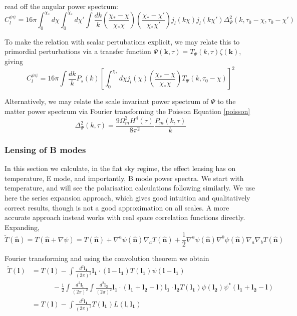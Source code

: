 \documentclass[a4paper,10pt]{article}
\renewcommand{\v}[1]{\mathbf{#1}}
\newcommand{\half}{\frac{1}{2}}
\newcommand{\finttwo}[1]{\int \frac{d^2 \v{#1}}{(2\pi)^2}}
\newcommand{\unit}[1]{\hat{\v{#1}}}
\begin{document}
read off the angular power spectrum:
\begin{equation}
C_l^{\psi\psi} = 16\pi \int_0^{\chi_*} d\chi \int_0^{\chi_*} d\chi' \int \frac{dk}{k} (\frac{\chi_*-\chi}{\chi_*\chi})(\frac{\chi_*-\chi'}{\chi_*\chi'})j_l(k\chi)j_l(k\chi')\Delta^2_\Psi(k, \tau_0-\chi, \tau_0-\chi')
\end{equation}

To make the relation with scalar pertubations explicit, we may relate this to primordial perturbations via a transfer function $\Psi(\v{k},\tau)=T_\Psi(k,\tau)\zeta(\v{k})$, giving
\begin{equation}
C_l^{\psi\psi} = 16\pi \int \frac{dk}{k} P_s(k) \left[\int_0^{\chi_*} d\chi j_l(\chi) (\frac{\chi_*-\chi}{\chi_*\chi})T_\Psi(k, \tau_0-\chi)\right]^2
\end{equation}

Alternatively, we may relate the scale invariant power spectrum of $\Psi$ to the matter power spectrum via Fourier transforming the Poisson Equation \ref{poisson}\\
\begin{equation}
\Delta^2_\Psi(k,\tau) = \frac{9\Omega^2_mH^4(\tau)}{8\pi^2}\frac{P_m(k,\tau)}{k}
\end{equation}

\subsubsection{Lensing of B modes} 

In this section we calculate, in the flat sky regime, the effect lensing has on temperature, E mode, and importantly, B mode power spectra. We start with temperature, and will see the polarisation calculations following similarly. We use here the series expansion approach, which gives good intuition and qualitatively correct results, though is not a good approximation on all scales. A more accurate approach instead works with real space correlation functions directly. Expanding,
\begin{equation}
\tilde{T}(\unit{n}) = T(\unit{n}+\nabla\psi) =T(\unit{n})+\nabla^a\psi(\unit{n})\nabla_aT(\unit{n})+\half\nabla^a\psi(\unit{n})\nabla^b\psi(\unit{n})\nabla_a\nabla_bT(\unit{n})
\end{equation}

Fourier transforming and using the convolution theorem we obtain
\begin{equation}\begin{split}
\tilde{T}(\v{l}) &= T(\v{l}) - \finttwo{l_1} \v{l_1}\cdot(\v{l}-\v{l_1})T(\v{l_1})\psi(\v{l}-\v{l_1}) \\
& \qquad \quad -\half \finttwo{l_1}\finttwo{l_2}\v{l_1}\cdot(\v{l_1}+\v{l_2}-\v{l})\v{l_1}\cdot\v{l_2}T(\v{l_1})\psi(\v{l_2})\psi^*(\v{l_1}+\v{l_2}-\v{l})\\
&= T(\v{l}) - \finttwo{l_1} T(\v{l_1})L(\v{l},\v{l_1})
\label{lensedtemp}
\end{split}\end{equation}
\end{document}
